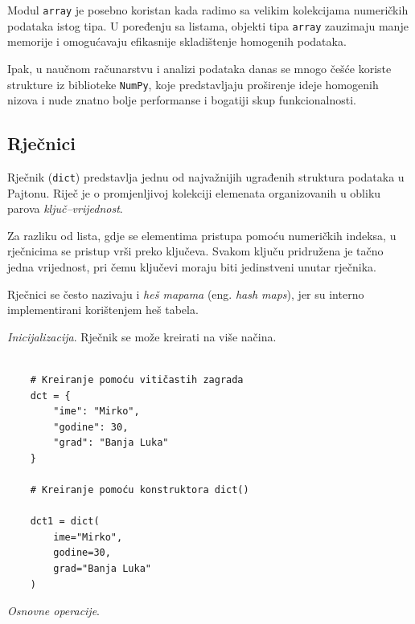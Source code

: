 
Modul \texttt{array} je posebno koristan kada radimo sa velikim kolekcijama numeričkih podataka istog tipa. U poređenju sa listama, objekti tipa \texttt{array} zauzimaju manje memorije i omogućavaju efikasnije skladištenje homogenih podataka.

Ipak, u naučnom računarstvu i analizi podataka danas se mnogo češće koriste strukture iz biblioteke \texttt{NumPy}, koje predstavljaju proširenje ideje homogenih nizova i nude znatno bolje performanse i bogatiji skup funkcionalnosti.




\subsection{Rječnici}

Rječnik (\texttt{dict}) predstavlja jednu od najvažnijih ugrađenih struktura podataka u Pajtonu. Riječ je o promjenljivoj kolekciji elemenata organizovanih u obliku parova \emph{ključ--vrijednost}.

Za razliku od lista, gdje se elementima pristupa pomoću numeričkih indeksa, u rječnicima se pristup vrši preko ključeva. Svakom ključu pridružena je tačno jedna vrijednost, pri čemu ključevi moraju biti jedinstveni unutar rječnika.

Rječnici se često nazivaju i \textit{heš mapama} (eng. \textit{hash maps}), jer su interno implementirani korištenjem heš tabela.

\textit{Inicijalizacija}.  Rječnik se može kreirati na više načina.

\begin{verbatim}
	
	# Kreiranje pomoću vitičastih zagrada
	dct = {
		"ime": "Mirko",
		"godine": 30,
		"grad": "Banja Luka"
	}
	
	# Kreiranje pomoću konstruktora dict()
	
	dct1 = dict(
	    ime="Mirko",
	    godine=30,
	    grad="Banja Luka"
	)
\end{verbatim}

\textit{Osnovne operacije}. 


